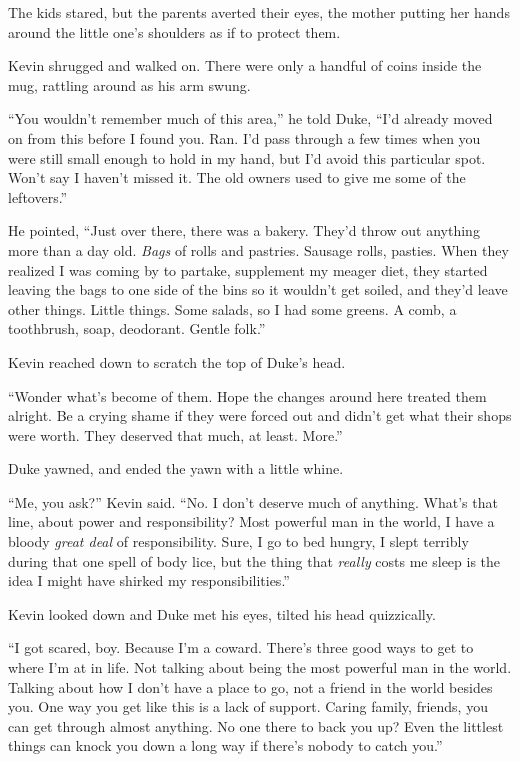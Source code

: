 The kids stared, but the parents averted their eyes, the mother putting her hands around the little one's shoulders as if to protect them.



Kevin shrugged and walked on.  There were only a handful of coins inside the mug, rattling around as his arm swung.



``You wouldn't remember much of this area,'' he told Duke, ``I'd already moved on from this before I found you.  Ran.  I'd pass through a few times when you were still small enough to hold in my hand, but I'd avoid this particular spot.  Won't say I haven't missed it.  The old owners used to give me some of the leftovers.''



He pointed, ``Just over there, there was a bakery.  They'd throw out anything more than a day old.  \emph{Bags} of rolls and pastries.  Sausage rolls, pasties.  When they realized I was coming by to partake, supplement my meager diet, they started leaving the bags to one side of the bins so it wouldn't get soiled, and they'd leave other things.  Little things.  Some salads, so I had some greens.  A comb, a toothbrush, soap, deodorant.  Gentle folk.''



Kevin reached down to scratch the top of Duke's head.



``Wonder what's become of them.  Hope the changes around here treated them alright.  Be a crying shame if they were forced out and didn't get what their shops were worth.  They deserved that much, at least.  More.''



Duke yawned, and ended the yawn with a little whine.



``Me, you ask?'' Kevin said.  ``No.  I don't deserve much of anything.  What's that line, about power and responsibility?  Most powerful man in the world, I have a bloody \emph{great deal} of responsibility.  Sure, I go to bed hungry, I slept terribly during that one spell of body lice, but the thing that \emph{really} costs me sleep is the idea I might have shirked my responsibilities.''



Kevin looked down and Duke met his eyes, tilted his head quizzically.



``I got scared, boy.  Because I'm a coward.  There's three good ways to get to where I'm at in life.  Not talking about being the most powerful man in the world.  Talking about how I don't have a place to go, not a friend in the world besides you.  One way you get like this is a lack of support.  Caring family, friends, you can get through almost anything.  No one there to back you up?  Even the littlest things can knock you down a long way if there's nobody to catch you.''




